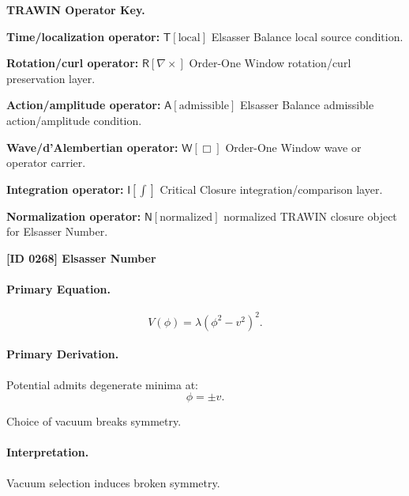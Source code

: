 \par\vspace{0.45\baselineskip}
\noindent\begin{minipage}[t]{\linewidth}
\begingroup
\small
\raggedright
\textbf{TRAWIN Operator Key.}\par
\noindent\textbf{Time/localization operator:} $\mathsf{T}\!\left[\mathrm{local}\right]$ Elsasser Balance local source condition.\par
\noindent\textbf{Rotation/curl operator:} $\mathsf{R}\!\left[\nabla\times\right]$ Order-One Window rotation/curl preservation layer.\par
\noindent\textbf{Action/amplitude operator:} $\mathsf{A}\!\left[\mathrm{admissible}\right]$ Elsasser Balance admissible action/amplitude condition.\par
\noindent\textbf{Wave/d'Alembertian operator:} $\mathsf{W}\!\left[\Box\right]$ Order-One Window wave or operator carrier.\par
\noindent\textbf{Integration operator:} $\mathsf{I}\!\left[\int\right]$ Critical Closure integration/comparison layer.\par
\noindent\textbf{Normalization operator:} $\mathsf{N}\!\left[\mathrm{normalized}\right]$ normalized TRAWIN closure object for Elsasser Number.\par
\endgroup
\end{minipage}

\clearpage
\noindent\textbf{[ID 0268] Elsasser Number}\par
\vspace{0.35em}
\paragraph{Primary Equation.}
\begin{equation}
V(\phi) = \lambda(\phi^2 - v^2)^2.
\end{equation}

\paragraph{Primary Derivation.}
Potential admits degenerate minima at:
\begin{equation}
\phi = \pm v.
\end{equation}

Choice of vacuum breaks symmetry.

\paragraph{Interpretation.}
Vacuum selection induces broken symmetry.


